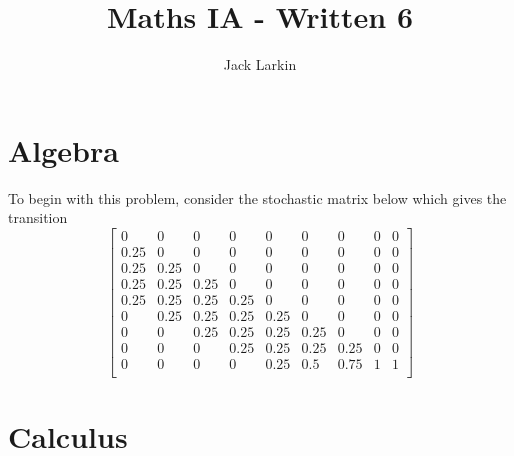 \documentclass[11pt]{article}
\title{\textbf{Maths IA - Written 6}}
\date{}
\author{Jack Larkin}
\begin{document}
\maketitle

\section*{Algebra}
To begin with this problem, consider the stochastic matrix below which gives the transition 
$$\begin{bmatrix}
0 & 0 & 0 & 0 & 0 & 0 & 0 & 0 & 0\\
0.25 & 0 & 0 & 0 & 0 & 0 & 0 & 0 & 0\\
0.25 & 0.25 & 0 & 0 & 0 & 0 & 0 & 0 & 0\\
0.25 & 0.25 & 0.25 & 0 & 0 & 0 & 0 & 0 & 0\\
0.25 & 0.25 & 0.25 & 0.25 & 0 & 0 & 0 & 0 & 0\\
0 & 0.25 & 0.25 & 0.25 & 0.25 & 0 & 0 & 0 & 0\\
0 & 0 & 0.25 & 0.25 & 0.25 & 0.25 & 0 & 0 & 0\\
0 & 0 & 0 & 0.25 & 0.25 & 0.25 & 0.25 & 0 & 0\\
0 & 0 & 0 & 0 & 0.25 & 0.5 & 0.75 & 1 & 1\\

\end{bmatrix}$$
\section*{Calculus}
\end{document}
